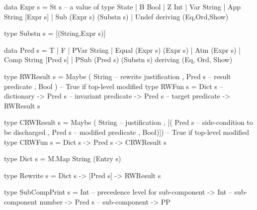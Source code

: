 \label{ha:calc-types-txt}



\begin{code}
data Expr s
 = St s  -- a value of type State
 | B Bool
 | Z Int
 | Var String
 | App String [Expr s]
 | Sub (Expr s) (Substn s)
 | Undef
 deriving (Eq,Ord,Show)

type Substn s = [(String,Expr s)]
\end{code}

\begin{code}
data Pred s
 = T
 | F
 | PVar String
 | Equal (Expr s) (Expr s)
 | Atm (Expr s)
 | Comp String [Pred s]
 | PSub (Pred s) (Substn s)
 deriving (Eq, Ord, Show)
\end{code}
\begin{code}
type RWResult s
 = Maybe ( String  -- rewrite justification
         , Pred s  -- result predicate
         , Bool )  -- True if top-level modified
type RWFun s = Dict s     -- dictionary
            -> Pred s     -- invariant predicate
            -> Pred s     -- target predicate
            -> RWResult s
\end{code}

\begin{code}
type CRWResult s
 = Maybe ( String      -- justification
         , [( Pred s   -- side-condition to be discharged
            , Pred s   -- modified predicate
            , Bool)])  -- True if top-level modified
type CRWFun s = Dict s -> Pred s -> CRWResult s
\end{code}

\newpage
\begin{code}
type Dict s = M.Map String (Entry s)
\end{code}

\begin{code}
type Rewrite s = Dict s -> [Pred s] -> RWResult s
\end{code}

\begin{code}
type SubCompPrint s
 = Int       -- precedence level for sub-component
   -> Int    -- sub-component number
   -> Pred s -- sub-component
   -> PP
\end{code}


